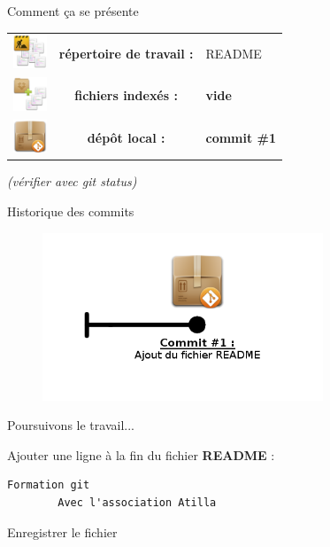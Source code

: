 \documentclass{beamer}
\begin{document}
\begin{frame}{Comment ça se présente}
	\begin{center}
		\begin{tabular}{l c l}
		\includegraphics[width=1cm]{img/working_dir} & \textbf{répertoire de travail :} & README \\
		\includegraphics[width=1cm]{img/stash} & \textbf{fichiers indexés :} & \textbf{vide}\\
		\includegraphics[width=1cm]{img/git_repo} & \textbf{dépôt local :} & \textbf{commit \#1} \\ 
		\end{tabular} 
	\end{center}

	\begin{center}
		\textit{(vérifier avec git status)}
	\end{center}
\end{frame}

\begin{frame}{Historique des commits}

	\begin{figure}
		\centering
		\includegraphics[height=5cm]{img/repo2}
	\end{figure}
\end{frame}

\begin{frame}[fragile]{Poursuivons le travail...}

	Ajouter une ligne à la fin du fichier \textbf{README} :
	\begin{lstlisting}[frame=single]
		Formation git
		Avec l'association Atilla
	\end{lstlisting}
	Enregistrer le fichier
\end{frame}
\end{document}
